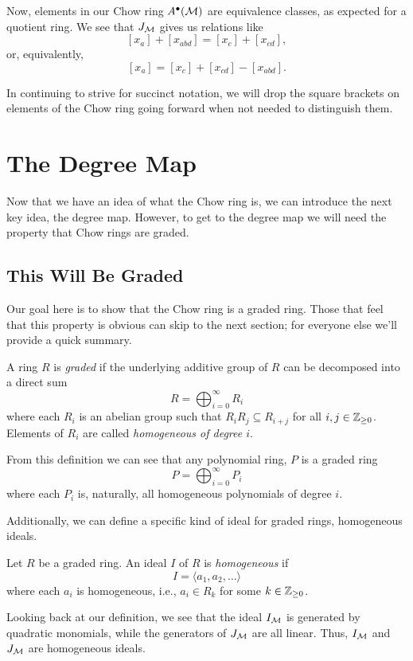 \documentclass[12pt,oneside]{../../sfsuthesis}
\begin{document}
Now, elements in our Chow ring \( A^\bullet(\mathcal{M}) \) are equivalence classes, as expected for a quotient ring.
We see that \( J_{\mathcal{M}} \) gives us relations like
\[
    [x_a] + [x_{abd}] = [x_c] + [x_{cd}],
\]
or, equivalently,
\[
    [x_a] = [x_c] + [x_{cd}] - [x_{abd}].
\]

In continuing to strive for succinct notation, we will drop the square brackets on elements of the Chow ring going forward when not needed to distinguish them.

\section{The Degree Map}

Now that we have an idea of what the Chow ring is, we can introduce the next key idea, the degree map.
However, to get to the degree map we will need the property that Chow rings are graded.

\subsection{This Will Be Graded}
Our goal here is to show that the Chow ring is a graded ring.
Those that feel that this property is obvious can skip to the next section; for everyone else we'll provide a quick summary.
\begin{definition}
    A ring \( R \) is \emph{graded} if the underlying additive group of \( R \) can be decomposed into a direct sum
    \[
        R = \bigoplus_{i=0}^\infty R_i
    \]
    where each \( R_i \) is an abelian group such that \( R_i R_j \subseteq R_{i+j} \) for all \( i, j \in \mathbb{Z}_{\geq 0}\).
    Elements of \( R_i \) are called \emph{homogeneous of degree \( i \)}.
\end{definition}
From this definition we can see that any polynomial ring, \( P \) is a graded ring
\[
    P =  \bigoplus_{i=0}^\infty P_i
\]
where each \( P_i \) is, naturally, all homogeneous polynomials of degree \( i \).

Additionally, we can define a specific kind of ideal for graded rings, homogeneous ideals.
\begin{definition}
    Let \( R \) be a graded ring. An ideal \( I \) of \( R \) is \emph{homogeneous} if
    \[
        I = \langle a_1, a_2, \dots \rangle
    \]
    where each \( a_i \) is homogeneous, i.e., \( a_i \in R_k \) for some \( k \in \mathbb{Z}_{\geq 0} \).
\end{definition}
Looking back at our definition, we see that the ideal \( I_{\mathcal{M}} \) is generated by quadratic monomials, while the generators of \( J_{\mathcal{M}} \) are all linear.
Thus, \( I_{\mathcal{M}} \) and \( J_{\mathcal{M}} \) are homogeneous ideals.
\end{document}
